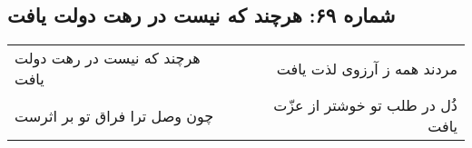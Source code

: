 \begin{center}
\section*{شماره ۶۹: هرچند که نیست در رهت دولت یافت}
\label{sec:069}
\begin{longtable}{l p{0.5cm} r}
هرچند که نیست در رهت دولت یافت
&&
مردند همه ز آرزوی لذت یافت
\\
چون وصل ترا فراق تو بر اثرست
&&
ذُل در طلب تو خوشتر از عزّت یافت
\\
\end{longtable}
\end{center}
